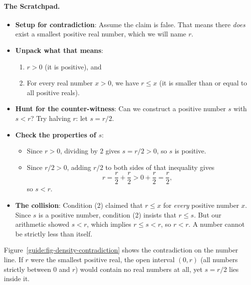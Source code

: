 \paragraph{The Scratchpad.}
\begin{itemize}
  \item \textbf{Setup for contradiction}: Assume the claim is false. That means there \emph{does} exist a smallest positive real number, which we will name $r$.
  \item \textbf{Unpack what that means}:
  \begin{enumerate}
    \item $r > 0$ (it is positive), and
    \item For every real number $x > 0$, we have $r \le x$ (it is smaller than or equal to all positive reals).
  \end{enumerate}
  \item \textbf{Hunt for the counter-witness}: Can we construct a positive number $s$ with $s < r$?
  Try halving $r$: let $s = r/2$.
  \item \textbf{Check the properties of $s$}:
  \begin{itemize}
    \item Since $r > 0$, dividing by $2$ gives $s = r/2 > 0$, so $s$ is positive.
    \item Since $r/2 > 0$, adding $r/2$ to both sides of that inequality gives
    \[
    r = \frac{r}{2} + \frac{r}{2} > 0 + \frac{r}{2} = \frac{r}{2},
    \]
    so $s < r$.
  \end{itemize}
  \item \textbf{The collision}: Condition (2) claimed that $r \le x$ for \emph{every} positive number $x$. Since $s$ is a positive number, condition (2) insists that $r \le s$. But our arithmetic showed $s < r$, which implies $r \le s < r$, so $r < r$. A number cannot be strictly less than itself.
\end{itemize}

Figure~\ref{guide:fig-density-contradiction} shows the contradiction on the number line. If $r$ were the smallest positive real, the open interval $(0, r)$ (all numbers strictly between $0$ and $r$) would contain no real numbers at all, yet $s = r/2$ lies inside it.

